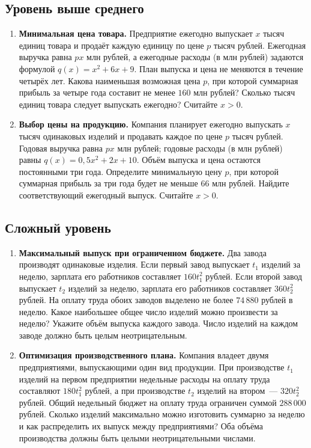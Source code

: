 \documentclass[a4paper,12pt]{article}
\begin{document}
\subsection*{Уровень выше среднего}
\begin{enumerate}[label=\textbf{\arabic*.},start=7]
\item \textbf{Минимальная цена товара.} Предприятие ежегодно выпускает $x$ тысяч единиц товара и продаёт каждую единицу по цене $p$ тысяч рублей. Ежегодная выручка равна $px$ млн рублей, а ежегодные расходы (в млн рублей) задаются формулой $q(x)=x^2+6x+9$. План выпуска и цена не меняются в течение четырёх лет. Какова наименьшая возможная цена $p$, при которой суммарная прибыль за четыре года составит не менее $160$ млн рублей? Сколько тысяч единиц товара следует выпускать ежегодно? Считайте $x>0$.

\item \textbf{Выбор цены на продукцию.} Компания планирует ежегодно выпускать $x$ тысяч одинаковых изделий и продавать каждое по цене $p$ тысяч рублей. Годовая выручка равна $px$ млн рублей; годовые расходы (в млн рублей) равны $q(x)=0{,}5x^2+2x+10$. Объём выпуска и цена остаются постоянными три года. Определите минимальную цену $p$, при которой суммарная прибыль за три года будет не меньше $66$ млн рублей. Найдите соответствующий ежегодный выпуск. Считайте $x>0$.
\end{enumerate}

\subsection*{Сложный уровень}
\begin{enumerate}[label=\textbf{\arabic*.},start=9]
\item \textbf{Максимальный выпуск при ограниченном бюджете.} Два завода производят одинаковые изделия. Если первый завод выпускает $t_1$ изделий за неделю, зарплата его работников составляет $160t_1^2$ рублей. Если второй завод выпускает $t_2$ изделий за неделю, зарплата его работников составляет $360t_2^2$ рублей. На оплату труда обоих заводов выделено не более $74\,880$ рублей в неделю. Какое наибольшее общее число изделий можно произвести за неделю? Укажите объём выпуска каждого завода. Число изделий на каждом заводе должно быть целым неотрицательным.

\item \textbf{Оптимизация производственного плана.} Компания владеет двумя предприятиями, выпускающими один вид продукции. При производстве $t_1$ изделий на первом предприятии недельные расходы на оплату труда составляют $180t_1^2$ рублей, а при производстве $t_2$ изделий на втором~--- $320t_2^2$ рублей. Общий недельный бюджет на оплату труда ограничен суммой $288\,000$ рублей. Сколько изделий максимально можно изготовить суммарно за неделю и как распределить их выпуск между предприятиями? Оба объёма производства должны быть целыми неотрицательными числами.
\end{enumerate}
\end{document}

